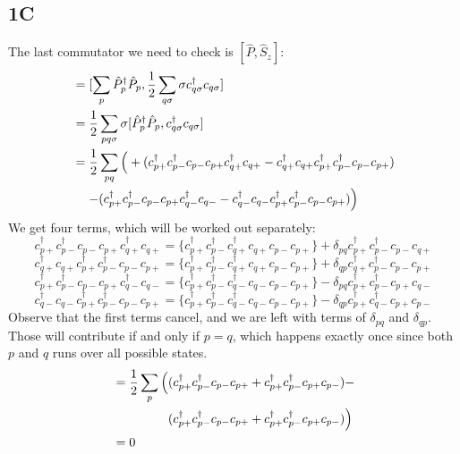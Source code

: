 \documentclass[norsk,a4paper,12pt]{article}
\begin{document}
\subsection*{1C}
The last commutator we need to check is $[\hat{P},\hat{S}_z]$:
\begin{align*}
[\hat{P},\hat{S}_z]&=[\sum_p\hat{P}_p^{\dagger}\hat{P}_p,\frac{1}{2}\sum_{q\sigma}\sigma c_{q\sigma}^{\dagger}c_{q\sigma}]\notag\\
&=\frac{1}{2}\sum_{pq\sigma}\sigma[\hat{P}_p^{\dagger}\hat{P}_p,c_{q\sigma}^{\dagger}c_{q\sigma}]\notag\\
&=\frac{1}{2}\sum_{pq}\Big(+(c_{p+}^{\dagger}c_{p-}^{\dagger}c_{p-}c_{p+}c_{q+}^{\dagger}c_{q+}-c_{q+}^{\dagger}c_{q+}c_{p+}^{\dagger}c_{p-}^{\dagger}c_{p-}c_{p+})\notag\\
&\mathrel{\phantom{=}}-(c_{p+}^{\dagger}c_{p-}^{\dagger}c_{p-}c_{p+}c_{q-}^{\dagger}c_{q-}-c_{q-}^{\dagger}c_{q-}c_{p+}^{\dagger}c_{p-}^{\dagger}c_{p-}c_{p+})\Big)
\end{align*}
We get four terms, which will be worked out separately:
\begin{equation*}
c_{p+}^{\dagger}c_{p-}^{\dagger}c_{p-}c_{p+}c_{q+}^{\dagger}c_{q+} = \{c_{p+}^{\dagger}c_{p-}^{\dagger}c_{q+}^{\dagger}c_{q+}c_{p-}c_{p+}\}+\delta_{pq}c_{p+}^{\dagger}c_{p-}^{\dagger}c_{p-}c_{q+}
\end{equation*}
\begin{equation*}
c_{q+}^{\dagger}c_{q+}c_{p+}^{\dagger}c_{p-}^{\dagger}c_{p-}c_{p+} = \{c_{p+}^{\dagger}c_{p-}^{\dagger}c_{q+}^{\dagger}c_{q+}c_{p-}c_{p+}\}+\delta_{qp}c_{q+}^{\dagger}c_{p-}^{\dagger}c_{p-}c_{p+}
\end{equation*}
\begin{equation*}
c_{p+}^{\dagger}c_{p-}^{\dagger}c_{p-}c_{p+}c_{q-}^{\dagger}c_{q-} = \{c_{p+}^{\dagger}c_{p-}^{\dagger}c_{q-}^{\dagger}c_{q-}c_{p-}c_{p+}\}-\delta_{pq}c_{p+}^{\dagger}c_{p-}^{\dagger}c_{p+}c_{q-}
\end{equation*}
\begin{equation*}
c_{q-}^{\dagger}c_{q-}c_{p+}^{\dagger}c_{p-}^{\dagger}c_{p-}c_{p+} = \{c_{p+}^{\dagger}c_{p-}^{\dagger}c_{q-}^{\dagger}c_{q-}c_{p-}c_{p+}\}-\delta_{qp}c_{p+}^{\dagger}c_{q-}^{\dagger}c_{p+}c_{p-}
\end{equation*}
Observe that the first terms cancel, and we are left with terms of $\delta_{pq}$ and $\delta_{qp}$. Those will contribute if and only if $p=q$, which happens exactly once since both $p$ and $q$ runs over all possible states. 
\begin{align*}
[\hat{P}, \hat{S}_z]&= \begin{aligned}[t]
\frac{1}{2}\sum_p\Big(&(c_{p+}^{\dagger}c_{p-}^{\dagger}c_{p-}c_{p+}+c_{p+}^{\dagger}c_{p-}^{\dagger}c_{p+}c_{p-})-\notag\\
&(c_{p+}^{\dagger}c_{p-}^{\dagger}c_{p-}c_{p+}+c_{p+}^{\dagger}c_{p-}^{\dagger}c_{p+}c_{p-})\Big)
\end{aligned}\\
&=0
\end{align*}
\end{document}
